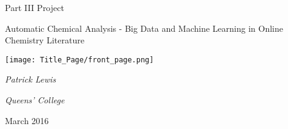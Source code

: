 \begin{titlepage}
	\centering
	{\LARGE Part III Project \par}
	{\LARGE Automatic Chemical Analysis - Big Data and Machine Learning in Online Chemistry Literature\par}
	\vspace{1cm}
	\texttt{[image: Title\_Page/front\_page.png]}\par\vspace{1cm}
	{\Large\itshape Patrick Lewis\par}
	{\Large\itshape Queens' College\par}
	\vspace{1.5cm}
	{\large March 2016\par}
\end{titlepage}